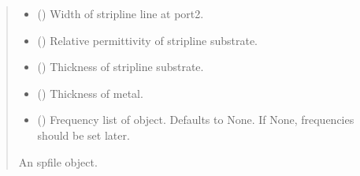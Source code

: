 \documentclass[letterpaper,10pt,english]{sphinxmanual}
\begin{document}
\begin{fulllineitems}
\begin{fulllineitems}
\begin{quote}
\begin{description}
\begin{itemize}
\item {} 
\sphinxAtStartPar
{} () \textendash{} Width of stripline line at port\sphinxhyphen{}2.

\item {} 
\sphinxAtStartPar
{} () \textendash{} Relative permittivity of stripline substrate.

\item {} 
\sphinxAtStartPar
{} () \textendash{} Thickness of stripline substrate.

\item {} 
\sphinxAtStartPar
{} () \textendash{} Thickness of metal.

\item {} 
\sphinxAtStartPar
{} (\sphinxstyleliteralemphasis{\sphinxupquote{, }}) \textendash{} Frequency list of object. Defaults to None. If None, frequencies should be set later.

\end{itemize}

\sphinxAtStartPar
An spfile object.

\sphinxAtStartPar
{\hyperref[\detokenize{touchstone:touchstone.spfile}]{}}

\end{description}\end{quote}

\end{fulllineitems}



\end{fulllineitems}
\end{document}

